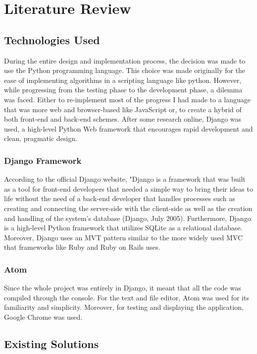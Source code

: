 
\chapter{Literature Review}

\section {Technologies Used}
During the entire design and implementation process, the decision was made to use the Python programming language. This choice was made originally for the ease of implementing algorithms in a scripting language like python. However, while progressing from the testing phase to the development phase, a dilemma was faced. Either to re-implement most of the progress I had made to a language that was more web and browser-based like JavaScript or, to create a hybrid of both front-end and back-end schemes. After some research online, Django was used, a high-level Python Web framework that encourages rapid development and clean, pragmatic design.

\subsection{Django Framework}
According to the official Django website, "Django is a framework that was built as a tool for front-end developers that needed a simple way to bring their ideas to life without the need of a back-end developer that handles processes such as creating and connecting the server-side with the client-side as well as the creation and handling of the system's database (Django, July 2005). Furthermore, Django is a high-level Python framework that utilizes SQLite as a relational database. Moreover, Django uses an MVT pattern similar to the more widely used MVC that frameworks like Ruby and Ruby on Rails uses.

\subsection {Atom}
Since the whole project was entirely in Django, it meant that all the code was compiled through the console. For the text and file editor, Atom was used for its familiarity and simplicity. Moreover, for testing and displaying the application, Google Chrome was used.

\section{Existing Solutions}

